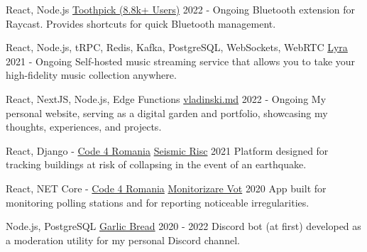 
\begin{cventries}

  \cventry
  {React, Node.js}
  {\href{https://github.com/VladCuciureanu/Toothpick}{Toothpick (8.8k+ Users)}}
  {}
  {2022 - Ongoing}
  {
    Bluetooth extension for Raycast. Provides shortcuts for quick Bluetooth management.
  }

  \cventry
  {React, Node.js, tRPC, Redis, Kafka, PostgreSQL, WebSockets, WebRTC}
  {\href{https://github.com/VladCuciureanu/Lyra}{Lyra}}
  {}
  {2021 - Ongoing}
  {
    Self-hosted music streaming service that allows you to take your high-fidelity music collection anywhere.
  }

  \cventry
  {React, NextJS, Node.js, Edge Functions}
  {\href{https://vladinski.md}{vladinski.md}}
  {}
  {2022 - Ongoing}
  {
    My personal website, serving as a digital garden and portfolio, showcasing my thoughts, experiences, and projects.
  }

  \cventry
  {React, Django - \href{https://code4.ro}{Code 4 Romania}}
  {\href{https://github.com/code4romania/seismic-risc}{Seismic Risc}}
  {}
  {2021}
  {
    Platform designed for tracking buildings at risk of collapsing in the event of an earthquake.
  }

  \cventry
  {React, NET Core - \href{https://code4.ro}{Code 4 Romania}}
  {\href{https://github.com/code4romania/monitorizare-vot/wiki}{Monitorizare Vot}}
  {}
  {2020}
  {
    App built for monitoring polling stations and for reporting noticeable irregularities.
  }

  \cventry
  {Node.js, PostgreSQL}
  {\href{https://github.com/VladCuciureanu/GarlicBread}{Garlic Bread}}
  {}
  {2020 - 2022}
  {
    Discord bot (at first) developed as a moderation utility for my personal Discord channel.
  }

\end{cventries}
